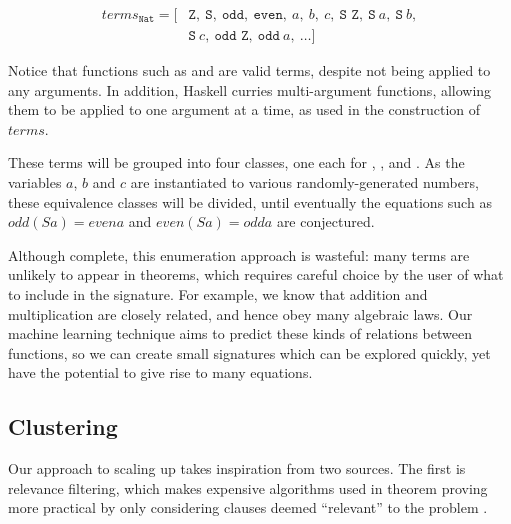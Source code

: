 \begin{align*}
  terms_{\texttt{Nat}} = [& \texttt{Z},\ \texttt{S},\ \texttt{odd},\ \texttt{even},\ a,\ b,\ c,\ \texttt{S Z},\ \texttt{S}\ a,\ \texttt{S}\ b, \\
                     & \texttt{S}\ c,\ \texttt{odd Z},\ \texttt{odd}\ a,\ \dots ]
\end{align*}

Notice that functions such as  and  are valid terms, despite not being applied to any arguments. In addition, Haskell curries multi-argument functions, allowing them to be applied to one argument at a time, as used in the construction of $terms$.

These terms will be grouped into four classes, one each for , ,  and . As the variables $a$, $b$ and $c$ are instantiated to various randomly-generated numbers, these equivalence classes will be divided, until eventually the equations such as $odd (S a) = even a$ and $even (S a) = odd a$ are conjectured.
\fi

Although complete, this enumeration approach is wasteful: many terms are unlikely to appear in theorems, which requires careful choice by the user of what to include in the signature. For example, we know that addition and multiplication are closely related, and hence obey many algebraic laws. Our machine learning technique aims to predict these kinds of relations between functions, so we can create small signatures which can be explored quickly, yet have the potential to give rise to many equations.

\iffalse
TODO{2019-02-07}
In fact, there are similarities between the way a TE system like \qspec{} can generalise from checking \emph{particular} properties to \emph{inventing} new ones, and the way counterexample finders like \qcheck{} can generalise from testing \emph{particular} expressions to \emph{inventing} expressions to test. One of our aims is to understand the implications of this generalisation, the lessons that each can learn from the other's approach to term generation, and the consequences for testing and QA in general.
\fi

\subsection{Clustering}
\label{sec:clustering}

Our approach to scaling up \qspec{} takes inspiration from two sources. The first is relevance filtering, which makes expensive algorithms used in theorem proving more practical by only considering clauses deemed ``relevant'' to the problem \cite{meng2009lightweight}.

